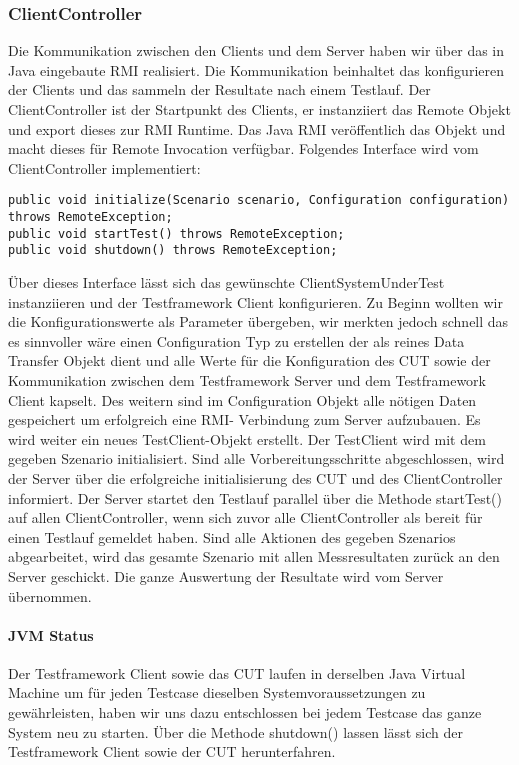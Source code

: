 \subsubsection{ClientController}
\label{sec:clientController}
Die Kommunikation zwischen den Clients und dem Server haben wir über das in Java eingebaute RMI realisiert. Die Kommunikation beinhaltet das konfigurieren der Clients und das sammeln der Resultate nach einem Testlauf. Der ClientController ist der Startpunkt des Clients, er instanziiert das Remote Objekt und export dieses zur RMI Runtime. Das Java RMI veröffentlich das Objekt und macht dieses für Remote Invocation verfügbar.
Folgendes Interface wird vom ClientController implementiert:
\begin{lstlisting}	
public void initialize(Scenario scenario, Configuration configuration) throws RemoteException;
public void startTest() throws RemoteException;
public void shutdown() throws RemoteException;
\end{lstlisting}
Über dieses Interface lässt sich das gewünschte ClientSystemUnderTest instanziieren und der Testframework Client konfigurieren. Zu Beginn wollten wir die Konfigurationswerte als Parameter übergeben, wir merkten jedoch schnell das es sinnvoller wäre einen Configuration Typ zu erstellen der als reines Data Transfer Objekt dient und alle Werte für die Konfiguration des CUT sowie der Kommunikation zwischen dem Testframework Server und dem Testframework Client kapselt. Des weitern sind im Configuration Objekt alle nötigen Daten gespeichert um erfolgreich eine RMI- Verbindung zum Server aufzubauen. Es wird weiter ein neues TestClient-Objekt erstellt. Der TestClient wird mit dem gegeben Szenario initialisiert. Sind alle Vorbereitungsschritte abgeschlossen, wird der Server über die erfolgreiche initialisierung des CUT und des ClientController informiert. Der Server startet den Testlauf parallel über die Methode startTest() auf allen ClientController, wenn sich zuvor alle ClientController als bereit für einen Testlauf gemeldet haben. Sind alle Aktionen des gegeben Szenarios abgearbeitet, wird das gesamte Szenario mit allen Messresultaten zurück an den Server geschickt. Die ganze Auswertung der Resultate wird vom Server übernommen. 

\paragraph{JVM Status} 
Der Testframework Client sowie das CUT laufen in derselben Java Virtual Machine um für jeden Testcase dieselben Systemvoraussetzungen zu gewährleisten, haben wir uns dazu entschlossen bei jedem Testcase das ganze System neu zu starten. Über die Methode shutdown() lassen lässt sich der Testframework Client sowie der CUT herunterfahren.


